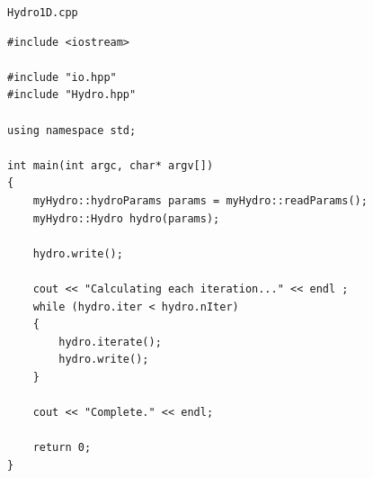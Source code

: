\documentclass[12pt]{article}
\begin{document}
\pagebreak
\texttt{Hydro1D.cpp}
\begin{Verbatim}[fontsize=\small]
#include <iostream>

#include "io.hpp"
#include "Hydro.hpp"

using namespace std;

int main(int argc, char* argv[])
{
    myHydro::hydroParams params = myHydro::readParams();
    myHydro::Hydro hydro(params);

    hydro.write();

    cout << "Calculating each iteration..." << endl ;
    while (hydro.iter < hydro.nIter)
    {
        hydro.iterate();
        hydro.write();
    }

    cout << "Complete." << endl;

    return 0;
}
\end{Verbatim}
\end{document}
